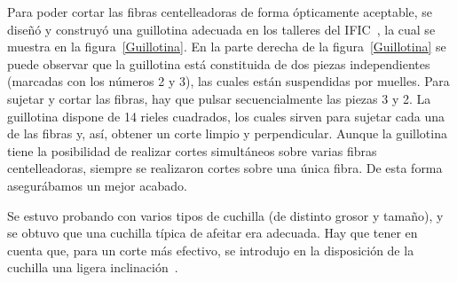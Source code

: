 Para poder cortar las fibras centelleadoras de forma ópticamente aceptable, se diseñó y construyó una guillotina adecuada en los talleres del IFIC~\cite{Alberto,anguloytiempo, dependencias, tesisfibras}, la cual se muestra en la figura~\ref{Guillotina}.
En la parte derecha de la figura~\ref{Guillotina} se puede observar que la guillotina está constituida de dos piezas independientes (marcadas con los números 2 y 3), las cuales están suspendidas por muelles. Para sujetar y cortar  las fibras, hay que pulsar  secuencialmente las piezas 3 y 2. 
La guillotina dispone de 14 rieles cuadrados, los cuales sirven para sujetar cada una de las fibras y, así, obtener un corte limpio y perpendicular. Aunque la guillotina tiene la posibilidad de realizar cortes simultáneos sobre varias fibras centelleadoras, siempre se realizaron cortes sobre una única fibra. De esta forma asegurábamos un mejor acabado.

Se estuvo probando con varios tipos de cuchilla (de distinto grosor y tamaño),  y se obtuvo que una cuchilla típica de afeitar era adecuada. Hay que tener en cuenta que, para un corte más efectivo, se introdujo en la disposición de la cuchilla una ligera inclinación~\cite{Alberto, anguloytiempo}. 

